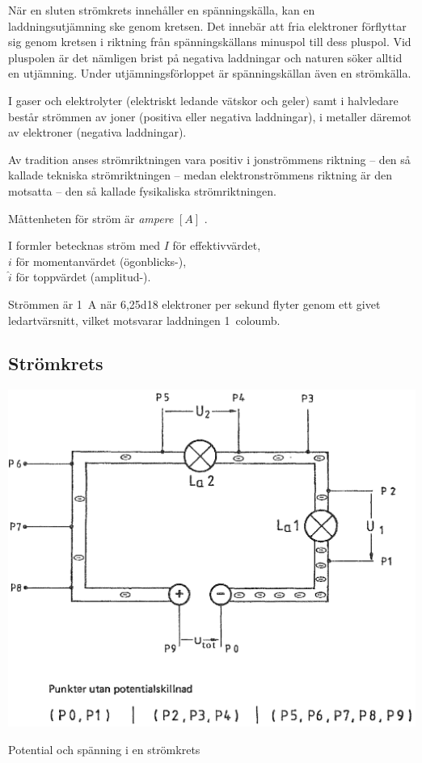 När en sluten strömkrets innehåller en spänningskälla, kan en
laddningsutjämning ske genom kretsen.
Det innebär att fria elektroner förflyttar sig genom kretsen i riktning från
spänningskällans minuspol till dess pluspol.
Vid pluspolen är det nämligen brist på negativa laddningar och naturen söker
alltid en utjämning.
Under utjämningsförloppet är spänningskällan även en strömkälla.

I gaser och elektrolyter (elektriskt ledande vätskor och geler) samt i
halvledare består strömmen av joner (positiva eller negativa
laddningar), i metaller däremot av elektroner (negativa laddningar).

Av tradition anses strömriktningen vara positiv i jonströmmens
riktning -- den så kallade tekniska strömriktningen -- medan
elektronströmmens riktning är den motsatta -- den så kallade
fysikaliska strömriktningen.

Måttenheten för ström är \emph{ampere} \(\unit{[A]}\) \cite{SIbrochure8}.

I formler betecknas ström med
\(I\) för effektivvärdet,\\
\(i\) för momentanvärdet (ögonblicks-),\\
\(\hat{i}\) för toppvärdet (amplitud-).

Strömmen är \SI{1}{A} när \num{6,25d18} elektroner per sekund
flyter genom ett givet ledartvärsnitt, vilket motsvarar laddningen
\SI{1}{coloumb}.

\subsection{Strömkrets}

\begin{marginfigure}
\includegraphics{images/cropped_pdfs/bild_2_1-03.pdf}
\caption{Potential och spänning i en strömkrets}
\label{fig:BildII1-3}
\end{marginfigure}

